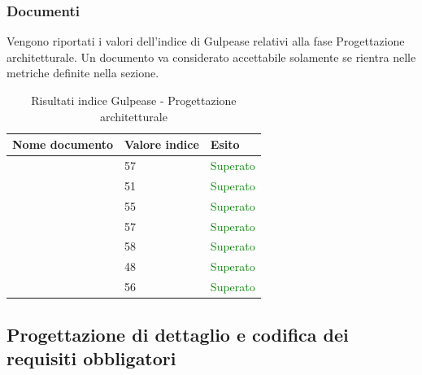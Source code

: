 	 	\subsubsection{Documenti}	 	
	 	Vengono riportati i valori dell'indice di Gulpease relativi alla fase Progettazione architetturale. Un documento va considerato accettabile solamente se rientra nelle metriche definite nella sezione.
		\begin{table}[!ht]
			\begin{center}
				\begin{tabularx}{0.9\textwidth}{|l|l|X|}
					\hline
					\textbf{Nome documento} & \textbf{Valore indice} & \textbf{Esito}\\
					\hline						
					\docNameVersionAdR & 57 & \textcolor{green}{Superato}\\
					\hline
					\docNameVersionGlo & 51 & \textcolor{green}{Superato}\\
					\hline					
					\docNameVersionNdP & 55 & \textcolor{green}{Superato}\\
					\hline					
					\docNameVersionPdP & 57 & \textcolor{green}{Superato}\\
					\hline					
					\docNameVersionPdQ & 58 & \textcolor{green}{Superato}\\
					\hline					
					\docNameVersionSdF & 48 & \textcolor{green}{Superato}\\
					\hline	
					\docNameVersionST & 56 & \textcolor{green}{Superato}\\
					\hline			
				\end{tabularx}
			\end{center}
			\caption{Risultati indice Gulpease - Progettazione architetturale}
		\end{table}
		
	\subsection{Progettazione di dettaglio e codifica dei requisiti obbligatori}
